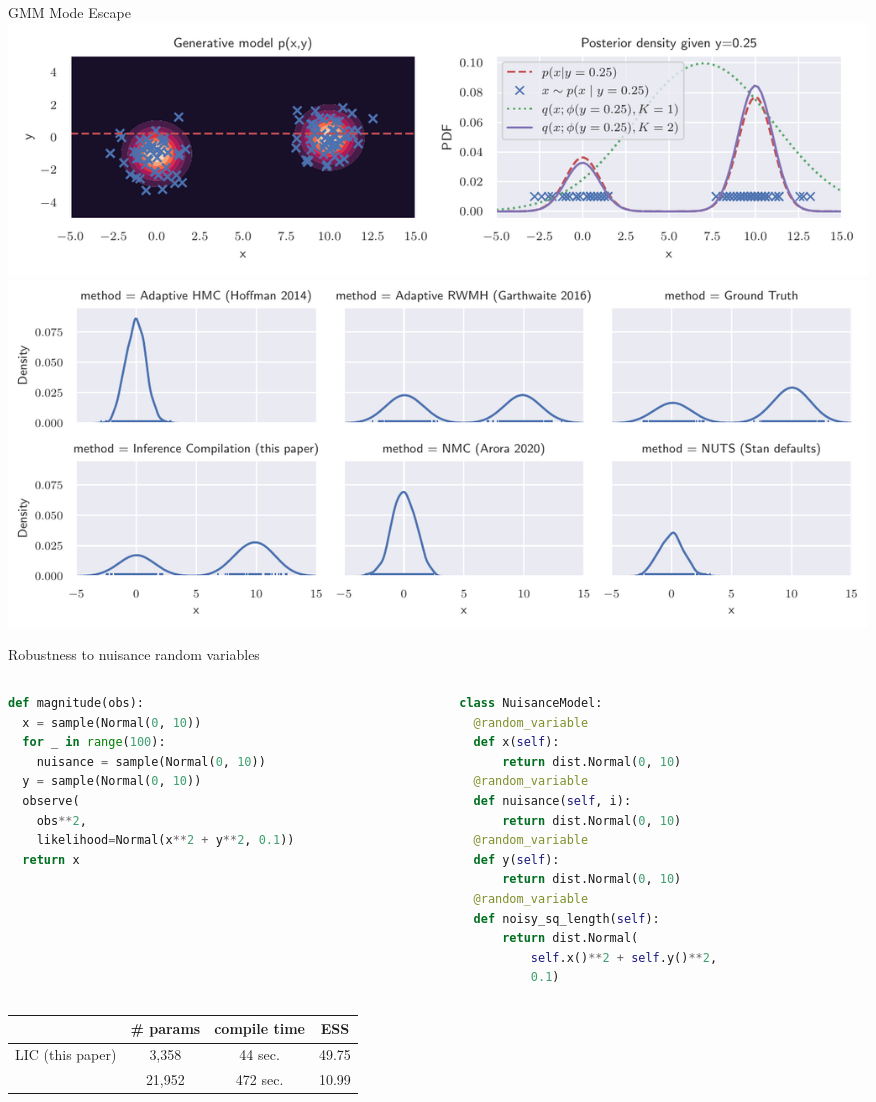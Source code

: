 \documentclass[12pt]{beamer}
\begin{document}
\begin{frame}{GMM Mode Escape}
    \includegraphics[width=\textwidth]{figures/intuition.pdf}
    \includegraphics[width=\textwidth]{figures/mode_escape.pdf}
\end{frame}

\begin{frame}[fragile]{Robustness to nuisance random variables}
    \begin{columns}
        \begin{column}{0.5\textwidth}
\begin{lstlisting}[language=Python]
def magnitude(obs):
  x = sample(Normal(0, 10))
  for _ in range(100):
    nuisance = sample(Normal(0, 10))
  y = sample(Normal(0, 10))
  observe(
    obs**2,
    likelihood=Normal(x**2 + y**2, 0.1))
  return x
\end{lstlisting}
        \end{column}
        \begin{column}{0.5\textwidth}
\begin{lstlisting}[language=Python]
class NuisanceModel:
  @random_variable
  def x(self):
      return dist.Normal(0, 10)
  @random_variable
  def nuisance(self, i):
      return dist.Normal(0, 10)
  @random_variable
  def y(self):
      return dist.Normal(0, 10)
  @random_variable
  def noisy_sq_length(self):
      return dist.Normal(
          self.x()**2 + self.y()**2, 
          0.1)
\end{lstlisting}
        \end{column}
    \end{columns}
    \begin{tabular}{lccc}
        \toprule
                            & \# params & compile time & ESS   \\
        \midrule
        LIC (this paper)       & 3,358     & 44 sec.      & 49.75 \\
        \cite{le2017inference} & 21,952    & 472 sec.     & 10.99 \\
        \bottomrule
    \end{tabular}
\end{frame}
\end{document}
